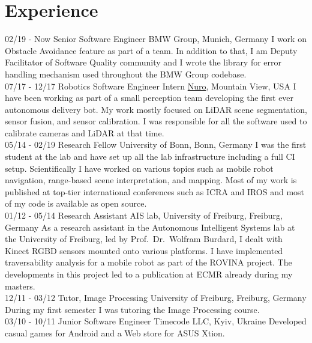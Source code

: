 \documentclass[]{friggeri-cv}
\begin{document}
\section{Experience}
\begin{entrylist}
  \entry
    {02/19 - Now}
    {Senior Software Engineer}
    {BMW Group, Munich, Germany}
    {I work on Obstacle Avoidance feature as part of a team. In addition to that, I am Deputy Facilitator of Software Quality community and I wrote the library for error handling mechanism used throughout the BMW Group codebase.\\}
  \entry
    {07/17 - 12/17}
    {Robotics Software Engineer Intern}
    {\href{https://nuro.ai/}{Nuro}, Mountain View, USA}
    {I have been working as part of a small perception team developing the first ever autonomous delivery bot. My work mostly focused on LiDAR scene segmentation, sensor fusion, and sensor calibration. I was responsible for all the software used to calibrate cameras and LiDAR at that time.\\}
  \entry
    {05/14 - 02/19}
    {Research Fellow}
    {University of Bonn, Bonn, Germany}
    {I was the first student at the lab and have set up all the lab infrastructure including a full CI setup. Scientifically I have worked on various topics such as mobile robot navigation, range-based scene interpretation, and mapping. Most of my work is published at top-tier international conferences such as ICRA and IROS and most of my code is available as open source.\\}
  \entry
    {01/12 - 05/14}
    {Research Assistant}
    {AIS lab, University of Freiburg, Freiburg, Germany}
    {As a research assistant in the Autonomous Intelligent Systems lab at the University of Freiburg, led by Prof.~Dr.~Wolfram Burdard, I dealt with Kinect RGBD sensors mounted onto various platforms. I have implemented traversability analysis for a mobile robot as part of the ROVINA project. The developments in this project led to a publication at ECMR already during my masters.\\}
  \entry
    {12/11 - 03/12}
    {Tutor, Image Processing}
    {University of Freiburg, Freiburg, Germany}
    {During my first semester I was tutoring the Image Processing course.\\}
  \entry
    {03/10 - 10/11}
    {Junior Software Engineer}
    {Timecode LLC, Kyiv, Ukraine}
    {Developed casual games for Android and a Web store for ASUS Xtion.}
\end{entrylist}
\\
\end{document}
